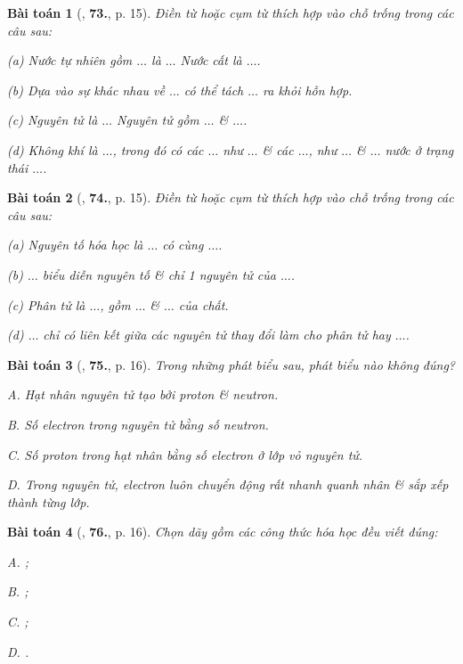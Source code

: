 \documentclass{article}
\numberwithin{equation}{section}
\newtheorem{baitoan}{Bài toán}[section]
\begin{document}
\begin{baitoan}[\cite{An2011}, \textbf{73.}, p. 15]
	Điền từ hoặc cụm từ thích hợp vào chỗ trống trong các câu sau:
	\begin{enumerate*}
		\item[(a)] Nước tự nhiên gồm $\ldots$ là $\ldots$ Nước cất là $\ldots$.
		\item[(b)] Dựa vào sự khác nhau về $\ldots$ có thể tách $\ldots$ ra khỏi hỗn hợp.
		\item[(c)] Nguyên tử là $\ldots$ Nguyên tử gồm $\ldots$ \& $\ldots$.
		\item[(d)] Không khí là $\ldots$, trong đó có các $\ldots$ như $\ldots$ \& các $\ldots$, như $\ldots$ \& $\ldots$ nước ở trạng thái $\ldots$.
	\end{enumerate*}
\end{baitoan}

\begin{baitoan}[\cite{An2011}, \textbf{74.}, p. 15]
	Điền từ hoặc cụm từ thích hợp vào chỗ trống trong các câu sau:
	\begin{enumerate*}
		\item[(a)] Nguyên tố hóa học là $\ldots$ có cùng $\ldots$.
		\item[(b)] $\ldots$ biểu diễn nguyên tố \& chỉ 1 nguyên tử của $\ldots$.
		\item[(c)] Phân tử là $\ldots$, gồm $\ldots$ \& $\ldots$ của chất.
		\item[(d)] $\ldots$ chỉ có liên kết giữa các nguyên tử thay đổi làm cho phân tử hay $\ldots$.
	\end{enumerate*}
\end{baitoan}

\begin{baitoan}[\cite{An2011}, \textbf{75.}, p. 16]
	Trong những phát biểu sau, phát biểu nào không đúng?
	\begin{enumerate*}
		\item[{\rm\sf A.}] Hạt nhân nguyên tử tạo bởi proton \& neutron.
		\item[{\rm\sf B.}] Số electron trong nguyên tử bằng số neutron.
		\item[{\rm\sf C.}] Số proton trong hạt nhân bằng số electron ở lớp vỏ nguyên tử.
		\item[{\rm\sf D.}] Trong nguyên tử, electron luôn chuyển động rất nhanh quanh nhân \& sắp xếp thành từng lớp.
	\end{enumerate*}
\end{baitoan}

\begin{baitoan}[\cite{An2011}, \textbf{76.}, p. 16]
	Chọn dãy gồm các công thức hóa học đều viết đúng:
	\begin{enumerate*}
		\item[{\rm\sf A.}] ;
		\item[{\rm\sf B.}] ;
		\item[{\rm\sf C.}] ;
		\item[{\rm\sf D.}] .
	\end{enumerate*}
\end{baitoan}
\end{document}
